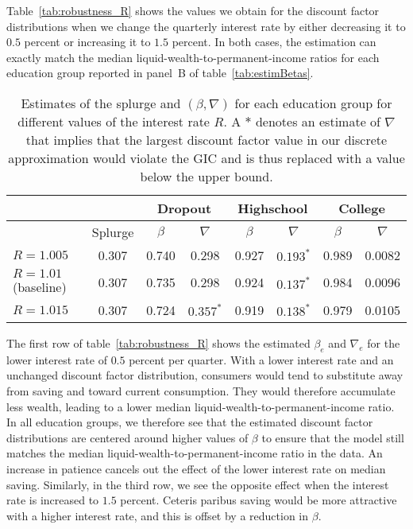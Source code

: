 \documentclass[\latexroot/\projectname]{subfiles}
\begin{document}
Table~\ref{tab:robustness_R} shows the values we obtain for the discount factor distributions when we change the quarterly interest rate by either decreasing it to $0.5$ percent or increasing it to $1.5$ percent. In both cases, the estimation can exactly match the median liquid-wealth-to-permanent-income ratios for each education group reported in panel~B of table~\ref{tab:estimBetas}.

\begin{table}[t]
  \begin{center}
    \begin{tabular}{lc|cccccc}
      \toprule
                            &         & \multicolumn{2}{c}{Dropout} & \multicolumn{2}{c}{Highschool} & \multicolumn{2}{c}{College}                                    \\ \midrule
                            & Splurge & $\beta$                     & $\nabla$                       & $\beta$                     & $\nabla$    & $\beta$ & $\nabla$ \\ \midrule
      $R = 1.005$           & 0.307   & 0.740                       & 0.298                          & 0.927                       & $0.193^{*}$ & 0.989   & 0.0082   \\
      $R = 1.01$ (baseline) & 0.307   & 0.735                       & 0.298                          & 0.924                       & $0.137^{*}$ & 0.984   & 0.0096   \\
      $R = 1.015$           & 0.307   & 0.724                       & $0.357^{*}$                    & 0.919                       & $0.138^{*}$ & 0.979   & 0.0105
      \\ \bottomrule
    \end{tabular}
    \caption{Estimates of the splurge and $(\beta,\nabla)$ for each education group for different values of the interest rate $R$.
      A $*$ denotes an estimate of $\nabla$ that implies that the largest discount factor value in our discrete approximation would violate the GIC and is thus replaced with a value below the upper bound.}
    \whenintegrated{\label{tab:robustness_R}} 
  \end{center}
\end{table}

The first row of table~\ref{tab:robustness_R} shows the estimated $\beta_e$ and $\nabla_e$ for the lower interest rate of $0.5$ percent per quarter.
With a lower interest rate and an unchanged discount factor distribution, consumers would tend to substitute away from saving and toward current consumption.
They would therefore accumulate less wealth, leading to a lower median liquid-wealth-to-permanent-income ratio.
In all education groups, we therefore see that the estimated discount factor distributions are centered around higher values of $\beta$ to ensure that the model still matches the median liquid-wealth-to-permanent-income ratio in the data.
An increase in patience cancels out the effect of the lower interest rate on median saving.
Similarly, in the third row, we see the opposite effect when the interest rate is increased to $1.5$ percent.
Ceteris paribus saving would be more attractive with a higher interest rate, and this is offset by a reduction in $\beta$.
\end{document}
